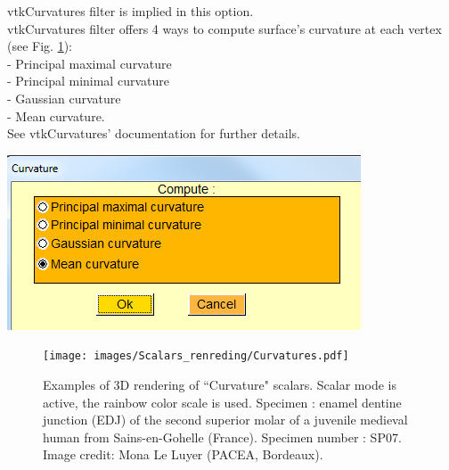 \noindent
\begin{minipage}{0.5\textwidth}
vtkCurvatures filter is implied in this option.\\
vtkCurvatures filter offers 4 ways to compute surface's
curvature at each vertex (see Fig. \ref{curvatures}):\\
- Principal maximal curvature\\
- Principal minimal curvature\\
- Gaussian curvature\\
- Mean curvature.\\
See vtkCurvatures' documentation for further details.

\end{minipage}    
\begin{minipage}{0.5\textwidth}\centering
  \includegraphics[scale=0.5]{images/Scalars_renreding/Curvature_window.png}
\label{curvature_window}
 \end{minipage} 
\noindent

\begin{figure}
  \centering
  \texttt{[image: images/Scalars\_renreding/Curvatures.pdf]} 
	\caption{
Examples of 3D rendering of ``Curvature" scalars. Scalar mode is active, the rainbow color scale is used. Specimen : enamel dentine junction (EDJ) of the second superior molar of a juvenile medieval human from Sains-en-Gohelle (France). Specimen number : SP07. Image credit: Mona Le Luyer (PACEA, Bordeaux).}
\label{curvatures}
 
\end{figure}

